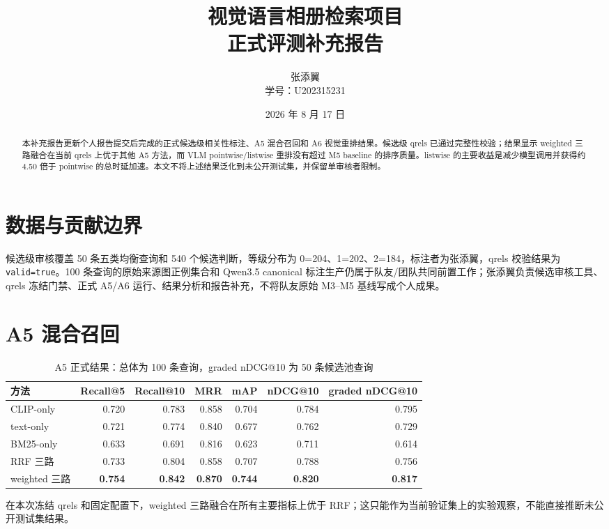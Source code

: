 \documentclass[UTF8,11pt,a4paper]{ctexart}
\title{视觉语言相册检索项目\\正式评测补充报告}
\author{张添翼\\学号：U202315231}
\date{2026 年 8 月 17 日}
\begin{document}
\maketitle
\begin{abstract}
本补充报告更新个人报告提交后完成的正式候选级相关性标注、A5 混合召回和 A6 视觉重排结果。候选级 qrels 已通过完整性校验；结果显示 weighted 三路融合在当前 qrels 上优于其他 A5 方法，而 VLM pointwise/listwise 重排没有超过 M5 baseline 的排序质量。listwise 的主要收益是减少模型调用并获得约 4.50 倍于 pointwise 的总时延加速。本文不将上述结果泛化到未公开测试集，并保留单审核者限制。
\end{abstract}

\section{数据与贡献边界}
候选级审核覆盖 50 条五类均衡查询和 540 个候选判断，等级分布为 0=204、1=202、2=184，标注者为张添翼，qrels 校验结果为 \texttt{valid=true}。100 条查询的原始来源图正例集合和 Qwen3.5 canonical 标注生产仍属于队友/团队共同前置工作；张添翼负责候选审核工具、qrels 冻结门禁、正式 A5/A6 运行、结果分析和报告补充，不将队友原始 M3--M5 基线写成个人成果。

\section{A5 混合召回}
\begin{table}[htbp]
\centering\small
\caption{A5 正式结果：总体为 100 条查询，graded nDCG@10 为 50 条候选池查询}
\begin{tabular}{lrrrrrr}
\toprule
方法 & Recall@5 & Recall@10 & MRR & mAP & nDCG@10 & graded nDCG@10\\
\midrule
CLIP-only & 0.720 & 0.783 & 0.858 & 0.704 & 0.784 & 0.795\\
text-only & 0.721 & 0.774 & 0.840 & 0.677 & 0.762 & 0.729\\
BM25-only & 0.633 & 0.691 & 0.816 & 0.623 & 0.711 & 0.614\\
RRF 三路 & 0.733 & 0.804 & 0.858 & 0.707 & 0.788 & 0.756\\
weighted 三路 & \textbf{0.754} & \textbf{0.842} & \textbf{0.870} & \textbf{0.744} & \textbf{0.820} & \textbf{0.817}\\
\bottomrule
\end{tabular}
\end{table}

在本次冻结 qrels 和固定配置下，weighted 三路融合在所有主要指标上优于 RRF；这只能作为当前验证集上的实验观察，不能直接推断未公开测试集结果。
\end{document}
